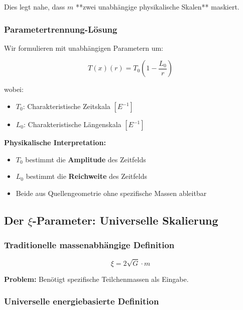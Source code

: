 \documentclass[12pt,a4paper]{article}
\newcommand{\Tfield}{T(x)}
\newcommand{\Tzero}{T_0}
\newcommand{\xipar}{\xi}
\begin{document}
	Dies legt nahe, dass $m$ **zwei unabhängige physikalische Skalen** maskiert.
	
	\subsubsection{Parametertrennung-Lösung}
	
	Wir formulieren mit unabhängigen Parametern um:
	
	\begin{equation}
		\boxed{\Tfield(r) = \Tzero\left(1 - \frac{L_0}{r}\right)}
		\label{eq:point_source_mass_free}
	\end{equation}
	
	wobei:
	\begin{itemize}
		\item $\Tzero$: Charakteristische Zeitskala $[E^{-1}]$
		\item $L_0$: Charakteristische Längenskala $[E^{-1}]$
	\end{itemize}
	
	\textbf{Physikalische Interpretation:}
	\begin{itemize}
		\item $\Tzero$ bestimmt die \textbf{Amplitude} des Zeitfelds
		\item $L_0$ bestimmt die \textbf{Reichweite} des Zeitfelds
		\item Beide aus Quellengeometrie ohne spezifische Massen ableitbar
	\end{itemize}
	
	\subsection{Der $\xipar$-Parameter: Universelle Skalierung}
	\label{subsec:xi_elimination}
	
	\subsubsection{Traditionelle massenabhängige Definition}
	
	\begin{equation}
		\xipar = 2\sqrt{G} \cdot m
		\label{eq:xi_original}
	\end{equation}
	
	\textbf{Problem:} Benötigt spezifische Teilchenmassen als Eingabe.
	
	\subsubsection{Universelle energiebasierte Definition}
	
\end{document}
